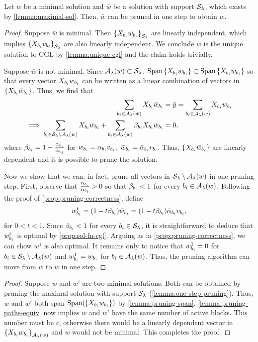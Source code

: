 \begin{lemma}\label{lemma:one-step-pruning}
	Let \( w \) be a minimal solution and \( \bar w \) be a solution with support
	\( \mathcal{S}_\lambda \), which exists by \cref{lemma:maximal-sol}.
	Then, \( \bar w \) can be pruned in one step to obtain \( w \).
\end{lemma}
\begin{proof}
	Suppose \( \bar w \) is minimal.
	Then \( \left\{X_{b_i} \bar{w}_{b_i}\right\}_{\mathcal{S}_\lambda} \) are linearly independent,
	which implies \( \left\{X_{b_i} v_{b_i}\right\}_{\mathcal{S}_\lambda} \) are also linearly independent.
	We conclude \( \bar w \) is the unique solution to CGL by \cref{lemma:unique-cgl}
	and the claim holds trivially.

	Suppose \( \bar w \) is not minimal.
	Since \( {\mathcal{A}_{\lambda}}(w) \subset \mathcal{S}_\lambda \),
	\( \text{Span}\left\{X_{b_i} w_{b_i}\right\} \subset \text{Span}\left\{X_{b_i} \bar{w}_{b_i}\right\} \)
	so that every vector \( X_{b_i} w_{b_i} \) can be written as a linear combination
	of vectors in \( \left\{X_{b_i} \bar{w}_{b_i}\right\} \).
	Thus, we find that
	\begin{align*}
		\sum_{{b_i} \in {\mathcal{A}_{\lambda}}(\bar w)} X_{b_i} \bar{w}_{b_i}
		 & = \hat y
		= \sum_{{b_i} \in {\mathcal{A}_{\lambda}}(w)} X_{b_i} w_{b_i} \\
		\implies
		\sum_{{b_i} \in \mathcal{S}_\lambda \setminus {\mathcal{A}_{\lambda}}(w)} X_{b_i} \bar{w}_{b_i} +
		\sum_{{b_i} \in {\mathcal{A}_{\lambda}}(w)} \beta_{{b_i}} X_{b_i} \bar{w}_{b_i}
		 & = 0,
	\end{align*}
	where \( \beta_{{b_i}} = 1 - \frac{\alpha_{b_i}}{\bar \alpha_{b_i}} \) for
	\( w_{b_i} = \alpha_{b_i} v_{b_i} \),
	\( \bar{w}_{b_i} = \bar \alpha_{b_i} v_{b_i} \).
	Thus, \( \left\{X_{b_i} \bar{w}_{b_i}\right\} \) are linearly dependent and it is possible
	to prune the solution.

	Now we show that we can, in fact, prune all vectors in \( \mathcal{S}_\lambda \setminus {\mathcal{A}_{\lambda}}(w) \)
	in one pruning step.
	First, observe that \( \frac{\alpha_{b_i}}{\bar \alpha_{b_i}} > 0 \) so that \( \beta_{b_i} < 1 \)
	for every \( {b_i} \in {\mathcal{A}_{\lambda}}(w) \).
	Following the proof of \cref{prop:pruning-correctness},
	define
	\[
		w_{b_i}^t = (1 - t \beta_{b_i}) \bar{w}_{b_i} = (1 - t \beta_{b_i}) \bar \alpha_{b_i} v_{b_i},
	\]
	for \( 0 < t < 1 \).
	Since \( \beta_{b_i} < 1 \) for every \( {b_i} \in \mathcal{S}_\lambda \),
	it is straightforward to deduce that \( w_{b_i}^t \) is optimal by
	\cref{prop:sol-fn-cgl}.
	Arguing as in \cref{prop:pruning-correctness}, we can show
	\( w^1 \) is also optimal.
	It remains only to notice that \( w_{b_i}^1 = 0 \) for \( {b_i} \in \mathcal{S}_\lambda \setminus {\mathcal{A}_{\lambda}}(w) \)
	and \( w_{b_i}^1 = w_{b_i} \) for \( {b_i} \in {\mathcal{A}_{\lambda}}(w) \).
	Thus, the pruning algorithm can move from \( \bar w \) to \( w \) in one step.
\end{proof}


\minimalSolCharacterization*
\begin{proof}
	Suppose \( w \) and \( w' \) are two minimal solutions.
	Both can be obtained by pruning the maximal solution with support \( \mathcal{S}_\lambda \) (\cref{lemma:one-step-pruning}).
	Thus, \( w \) and \( w' \) both span \( \text{Span}(\left\{X_{b_i} w_{b_i}\right\}) \) by \cref{lemma:pruning-span}.
	\cref{lemma:pruning-paths-equiv} now implies \( w \) and \( w' \)
	have the same number of active blocks.
	This number must be \( c \), otherwise there would be a linearly dependent vector
	in \( \left\{X_{b_i} w_{b_i}\right\}_{{\mathcal{A}_{\lambda}}\left(w\right)} \) and \( w \) would not be minimal.
	This completes the proof.
\end{proof}



